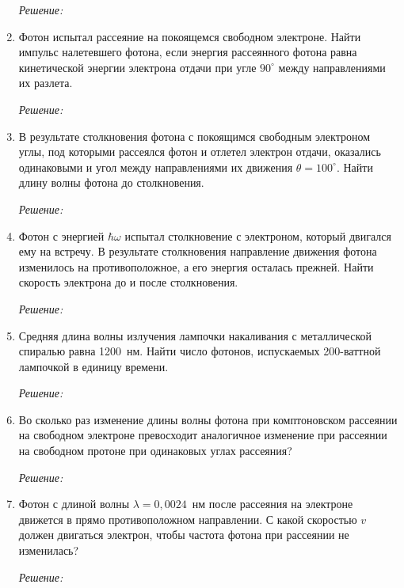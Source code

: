 \begin{enumerate}
\emph{Решение:}

\newpage

\item Фотон испытал рассеяние на покоящемся свободном электроне. Найти импульс
налетевшего фотона, если энергия рассеянного фотона равна кинетической энергии
электрона отдачи при угле \( 90^\circ \) между направлениями их разлета.

\emph{Решение:}

\newpage

\item В результате столкновения фотона с покоящимся свободным электроном углы,
под которыми рассеялся фотон и отлетел электрон отдачи, оказались одинаковыми и
угол между направлениями их движения \( \theta = 100^\circ \). Найти длину волны
фотона до столкновения.

\emph{Решение:}

\newpage

\item Фотон с энергией \( \hbar\omega \) испытал столкновение с электроном,
который двигался ему на встречу. В результате столкновения направление движения
фотона изменилось на противоположное, а его энергия осталась прежней. Найти
скорость электрона до и после столкновения.

\emph{Решение:}

\newpage

\item Средняя длина волны излучения лампочки накаливания с металлической
спиралью равна 1200~нм. Найти число фотонов, испускаемых 200-ваттной
лампочкой в единицу времени.

\emph{Решение:}

\newpage

\item Во сколько раз изменение длины волны фотона при комптоновском рассеянии на
свободном электроне превосходит аналогичное изменение при рассеянии на свободном
протоне при одинаковых углах рассеяния?

\emph{Решение:}

\newpage

\item Фотон с длиной волны \( \lambda = 0,\!0024 \)~нм после рассеяния на
электроне движется в прямо противоположном направлении. С какой скоростью
\( v \) должен двигаться электрон, чтобы частота фотона при рассеянии не
изменилась?

\emph{Решение:}

\end{enumerate}
